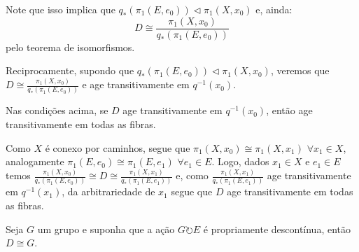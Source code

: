 
Note que isso implica que $q_*(\pi_1(E, e_0)) \triangleleft \pi_1(X, x_0)$ e, ainda: $$D \cong \frac{\pi_1(X, x_0)}{q_*(\pi_1(E, e_0))}$$ pelo teorema de isomorfismos.

Reciprocamente, supondo que $q_*(\pi_1(E, e_0)) \triangleleft \pi_1(X, x_0)$, veremos que $D \cong \frac{\pi_1(X, x_0)}{q_*(\pi_1(E, e_0))}$ e age transitivamente em $q^{-1}(x_0)$.

\begin{af}
    Nas condições acima, se $D$ age transitivamente em $q^{-1}(x_0)$, então age transitivamente em todas as fibras.
\end{af}

\begin{dem}
    Como $X$ é conexo por caminhos, segue que $\pi_1(X, x_0) \cong \pi_1(X, x_1)$ $\forall x_1 \in X$, analogamente $\pi_1(E, e_0) \cong \pi_1(E, e_1)$ $\forall e_1 \in E$. Logo, dados $x_1 \in X$ e $e_1 \in E$ temos $\frac{\pi_1(X, x_0)}{q_*(\pi_1(E, e_0))} \cong D \cong \frac{\pi_1(X, x_1)}{q_*(\pi_1(E, e_1))}$ e, como $\frac{\pi_1(X, x_1)}{q_*(\pi_1(E, e_1))}$ age transitivamente em $q^{-1}(x_1)$, da arbitrariedade de $x_1$ segue que $D$ age transitivamente em todas as fibras.
\end{dem}

\begin{lemma}
    Seja $G$ um grupo e suponha que a ação $G \circlearrowright E$ é propriamente descontínua, então $D \cong G$.
\end{lemma}

